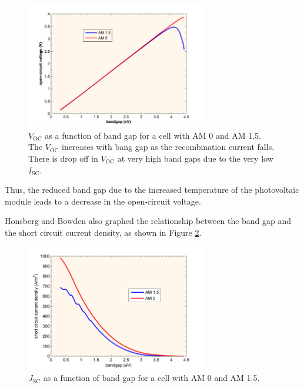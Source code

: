 \begin{figure}[ht]
    \centering
    \includegraphics[width=0.7\textwidth]{Figures/open-circuit_voltage_bandgap_graph.png}
    \caption{$V_\text{OC}$ as a function of band gap for a cell with AM 0 and AM 1.5. The $V_\text{OC}$ increases with bang gap as the recombination current falls. There is drop off in $V_\text{OC}$ at very high band gaps due to the very low $I_\text{SC}$. \cite{HonsbergOpen-CircuitVoltage}}
    \label{fig:open-circuit_voltage_bandgap_graph}
\end{figure}
\FloatBarrier

\noindent Thus, the reduced band gap due to the increased temperature of the photovoltaic module leads to a decrease in the open-circuit voltage. \cite{HonsbergOpen-CircuitVoltage}\vspace{0.5em}

\pagebreak
\noindent Honsberg and Bowden also graphed the relationship between the band gap and the short circuit current density, as shown in Figure \ref{fig:short_circuit_current_density_bandgap_graph}.

\begin{figure}[ht]
    \centering
    \includegraphics[width=0.7\textwidth]{Figures/short_circuit_current_density_bandgap_graph.png}
    \caption{$J_\text{SC}$ as a function of band gap for a cell with AM 0 and AM 1.5. \cite{HonsbergShort-CircuitCurrent}}
    \label{fig:short_circuit_current_density_bandgap_graph}
\end{figure}
\FloatBarrier

